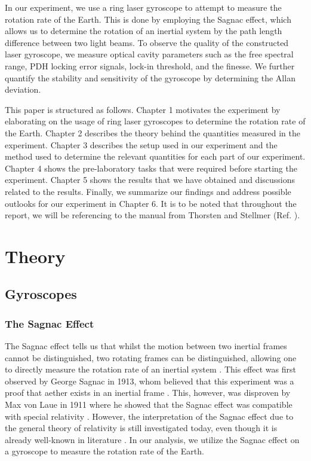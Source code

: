 \documentclass[a4paper]{report}
\numberwithin{equation}{section}
\begin{document}

In our experiment, we use a ring laser gyroscope to attempt to measure the rotation rate of the Earth. This is done by employing the Sagnac effect,
which allows us to determine the rotation of an inertial system by the path length difference between two light beams. To observe
the quality of the constructed laser gyroscope, we measure optical cavity parameters such as the free spectral range,
PDH locking error signals, lock-in threshold, and the finesse. We further quantify the stability and sensitivity of the gyroscope by 
determining the Allan deviation. \par 

This paper is structured as follows. Chapter 1 motivates the experiment by elaborating on the usage of ring laser gyroscopes
to determine the rotation rate of the Earth. Chapter 2 describes the theory behind the quantities measured in the experiment. Chapter 3
describes the setup used in our experiment and the method used to determine the relevant quantities for each part of our experiment. 
Chapter 4 shows the pre-laboratory tasks that were required before starting the experiment. Chapter 5 shows the results
that we have obtained and discussions related to the results. Finally, we summarize our findings and address possible outlooks for our experiment
in Chapter 6. It is to be noted that throughout the report, we will be referencing to the manual from Thorsten and Stellmer (Ref. \cite{Groh2021}).



\chapter{Theory}

\section{Gyroscopes}

\subsection{The Sagnac Effect}

The Sagnac effect tells us that whilst the motion between two inertial frames cannot be distinguished, two rotating frames can be 
distinguished, allowing one to directly measure the rotation rate of an inertial system \cite{Groh2021}. This effect was first observed by 
George Sagnac in 1913, whom believed that this experiment was a proof that aether exists in an inertial frame  \cite{Darrigol2014}. This, however, was 
disproven by Max von Laue in 1911 where he showed that the Sagnac effect was compatible with special relativity \cite{Laue1911}. 
However, the interpretation of the Sagnac effect due to the general theory of relativity is still investigated today, 
even though it is already well-known in literature \cite{Benedetto2019}. In our analysis, we utilize the Sagnac effect on a gyroscope to 
measure the rotation rate of the Earth.\par
\end{document}
